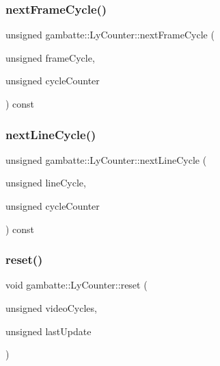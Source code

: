 \mbox{\label{classgambatte_1_1LyCounter_ad4792cfaee1272e0f38ac3fa706f40eb}} 
\subsubsection{\texorpdfstring{next\+Frame\+Cycle()}{nextFrameCycle()}}
{\footnotesize\ttfamily unsigned gambatte\+::\+Ly\+Counter\+::next\+Frame\+Cycle (\begin{DoxyParamCaption}\item[{unsigned}]{frame\+Cycle,  }\item[{unsigned}]{cycle\+Counter }\end{DoxyParamCaption}) const}

\mbox{\label{classgambatte_1_1LyCounter_a645947821ce5a4ea6c717e71538cb06b}} 
\subsubsection{\texorpdfstring{next\+Line\+Cycle()}{nextLineCycle()}}
{\footnotesize\ttfamily unsigned gambatte\+::\+Ly\+Counter\+::next\+Line\+Cycle (\begin{DoxyParamCaption}\item[{unsigned}]{line\+Cycle,  }\item[{unsigned}]{cycle\+Counter }\end{DoxyParamCaption}) const}

\mbox{\label{classgambatte_1_1LyCounter_a9b7cef000b6dd0b36c8379b94c3bf87d}} 
\subsubsection{\texorpdfstring{reset()}{reset()}}
{\footnotesize\ttfamily void gambatte\+::\+Ly\+Counter\+::reset (\begin{DoxyParamCaption}\item[{unsigned}]{video\+Cycles,  }\item[{unsigned}]{last\+Update }\end{DoxyParamCaption})}

